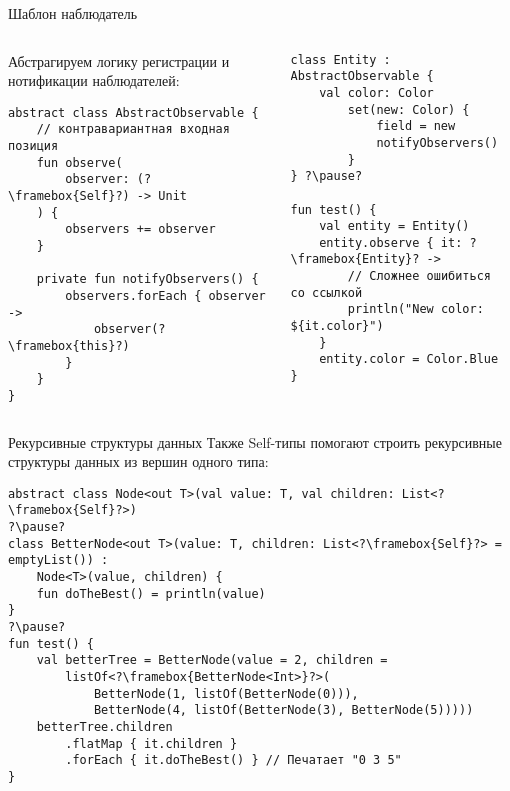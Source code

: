 \documentclass[handout,aspectratio=169,usenames,dvipsnames]{beamer}
\begin{document}
\begin{frame}[fragile]{Шаблон наблюдатель}
    \begin{columns}
        \begin{column}{0.48\textwidth}
            Абстрагируем логику регистрации и нотификации наблюдателей:
            \begin{verbatim}
abstract class AbstractObservable {
    // контравариантная входная позиция
    fun observe(
        observer: (?\framebox{Self}?) -> Unit
    ) {
        observers += observer
    }

    private fun notifyObservers() {
        observers.forEach { observer ->
            observer(?\framebox{this}?)
        }
    }
}
            \end{verbatim}
        \end{column}
        \pause
        \begin{column}{0.52\textwidth}
            \begin{verbatim}
class Entity : AbstractObservable {
    val color: Color
        set(new: Color) {
            field = new
            notifyObservers()
        }
} ?\pause?

fun test() {
    val entity = Entity()
    entity.observe { it: ?\framebox{Entity}? ->
        // Сложнее ошибиться со ссылкой
        println("New color: ${it.color}")
    }
    entity.color = Color.Blue
}
            \end{verbatim}
        \end{column}
    \end{columns}
\end{frame}

\begin{frame}[fragile]{Рекурсивные структуры данных}
    Также Self-типы помогают строить рекурсивные структуры данных из вершин одного типа:
    \begin{verbatim}
abstract class Node<out T>(val value: T, val children: List<?\framebox{Self}?>)
?\pause?
class BetterNode<out T>(value: T, children: List<?\framebox{Self}?> = emptyList()) :
    Node<T>(value, children) {
    fun doTheBest() = println(value)
}
?\pause?
fun test() {
    val betterTree = BetterNode(value = 2, children =
        listOf<?\framebox{BetterNode<Int>}?>(
            BetterNode(1, listOf(BetterNode(0))),
            BetterNode(4, listOf(BetterNode(3), BetterNode(5)))))
    betterTree.children
        .flatMap { it.children }
        .forEach { it.doTheBest() } // Печатает "0 3 5"
}
    \end{verbatim}
\end{frame}
\end{document}

